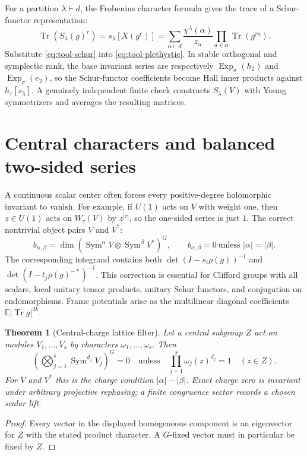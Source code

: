 \documentclass[10pt]{article}
\newcommand{\Sym}{\operatorname{Sym}}
\newcommand{\Tr}{\operatorname{Tr}}
\newcommand{\ExpS}{\operatorname{Exp}_{\sigma}}
\newcommand{\E}{\mathbb E}
\newtheorem{theorem}{Theorem}
\begin{document}
For a partition $\lambda\vdash d$, the Frobenius character formula gives the
trace of a Schur-functor representation:
\begin{equation}\label{eq:tool-schur}
\boxed{\Tr(S_\lambda(g)^r)=s_\lambda[X(g^r)]
=\sum_{\alpha\vdash d}\frac{\chi^\lambda(\alpha)}{z_\alpha}
\prod_{a\in\alpha}\Tr(g^{ra}).}
\end{equation}
Substitute \eqref{eq:tool-schur} into \eqref{eq:tool-plethystic}.  In stable
orthogonal and symplectic rank, the base invariant series are respectively
$\ExpS(h_2)$ and $\ExpS(e_2)$, so the Schur-functor coefficients become Hall
inner products against $h_\tau[s_\lambda]$.  A genuinely independent finite
check constructs $S_\lambda(V)$ with Young symmetrizers and averages the
resulting matrices.

\section{Central characters and balanced two-sided series}

A continuous scalar center often forces every positive-degree holomorphic
invariant to vanish.  For example, if $U(1)$ acts on $V$ with weight one, then
$z\in U(1)$ acts on $W_\tau(V)$ by $z^{|\tau|}$, so the one-sided series is
just $1$.  The correct nontrivial object pairs $V$ and $V^*$:
\[
b_{\alpha,\beta}
=\dim\left(\Sym^\alpha V\otimes\Sym^\beta V^*\right)^G,
\qquad b_{\alpha,\beta}=0\ \text{unless }|\alpha|=|\beta|.
\]
The corresponding integrand contains both
$\det(I-s_i\rho(g))^{-1}$ and
$\det(I-t_j\rho(g)^{-\!*})^{-1}$.  This correction is essential for Clifford
groups with all scalars, local unitary tensor products, unitary Schur
functors, and conjugation on endomorphisms.  Frame potentials arise as the
multilinear diagonal coefficients $\E|\Tr g|^{2k}$.

\begin{theorem}[Central-charge lattice filter]
Let a central subgroup $Z$ act on modules $V_1,\ldots,V_s$ by characters
$\omega_1,\ldots,\omega_s$. Then
\[
 \left(\bigotimes_{j=1}^s\Sym^{d_j}V_j\right)^G=0
 \quad\text{unless}\quad
 \prod_{j=1}^s\omega_j(z)^{d_j}=1\quad(z\in Z).
\]
For $V$ and $V^*$ this is the charge condition $|\alpha|-|\beta|$. Exact
charge zero is invariant under arbitrary projective rephasing; a finite
congruence sector records a chosen scalar lift.
\end{theorem}
\begin{proof}
Every vector in the displayed homogeneous component is an eigenvector for
$Z$ with the stated product character. A $G$-fixed vector must in particular
be fixed by $Z$.
\end{proof}
\end{document}
